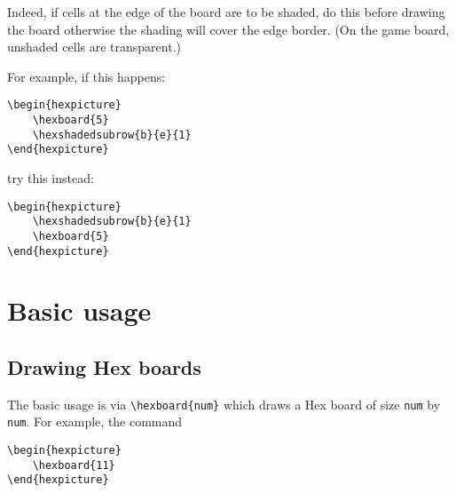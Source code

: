 \documentclass[a4paper,12pt]{article}
\begin{document}
    \begin{hexpicture}
    \end{hexpicture}

    Indeed, if cells at the edge of the board are to be shaded, do this before drawing the board otherwise the shading will cover the edge border. (On the game board, unshaded cells are transparent.)
    
    For example, if this happens:
    
    \begin{verbatim}\begin{hexpicture}
    \hexboard{5}
    \hexshadedsubrow{b}{e}{1}
\end{hexpicture}\end{verbatim}
    
    \begin{hexpicture}
    \end{hexpicture}

    try this instead:
    
    \begin{verbatim}\begin{hexpicture}
    \hexshadedsubrow{b}{e}{1}
    \hexboard{5}
\end{hexpicture}\end{verbatim}
    
    \begin{hexpicture}
    \end{hexpicture}
    

    \section{Basic usage}

    \subsection{Drawing Hex boards}
    
    The basic usage is via \verb|\hexboard{num}| which draws a Hex board of size \verb|num| by \verb|num|. For example, the command
    
    \begin{verbatim}\begin{hexpicture}
    \hexboard{11}
\end{hexpicture}\end{verbatim}
    
\end{document}
